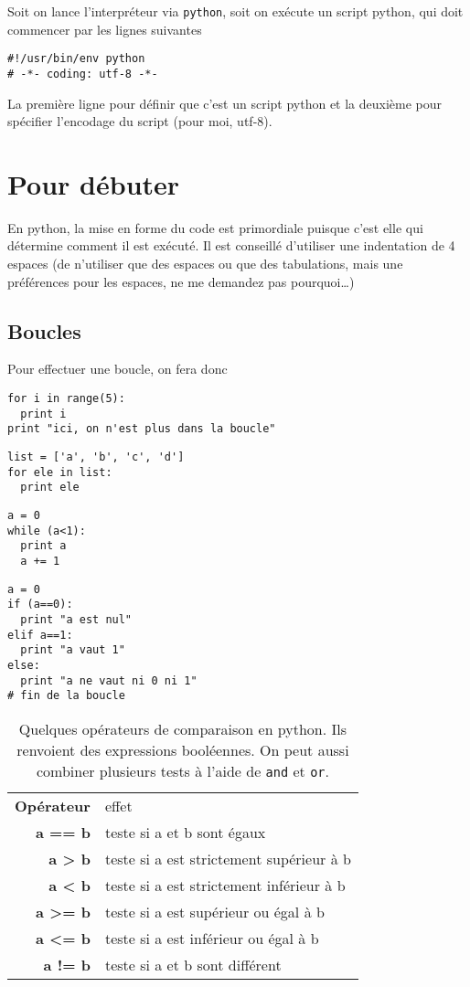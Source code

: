 \documentclass[a4paper,twoside]{article}
\title{}
\author{Autiwa}
\begin{document}
\tableofcontents

\clearpage
Soit on lance l'interpréteur via \verb|python|, soit on exécute un script python, qui doit commencer par les lignes suivantes
\begin{verbatim}
#!/usr/bin/env python
# -*- coding: utf-8 -*-
\end{verbatim}

La première ligne pour définir que c'est un script python et la deuxième pour spécifier l'encodage du script (pour moi, utf-8).

\section{Pour débuter}
En python, la mise en forme du code est primordiale puisque c'est elle qui détermine comment il est exécuté. Il est conseillé d'utiliser une indentation de 4 espaces (de n'utiliser que des espaces ou que des tabulations, mais une préférences pour les espaces, ne me demandez pas pourquoi\dots)

\subsection{Boucles}
Pour effectuer une boucle, on fera donc
\begin{verbatim}
for i in range(5):
  print i
print "ici, on n'est plus dans la boucle"
\end{verbatim}

\begin{verbatim}
list = ['a', 'b', 'c', 'd']
for ele in list:
  print ele
\end{verbatim}

\begin{verbatim}
a = 0
while (a<1):
  print a
  a += 1
\end{verbatim}

\begin{verbatim}
a = 0
if (a==0):
  print "a est nul"
elif a==1:
  print "a vaut 1"
else:
  print "a ne vaut ni 0 ni 1"
# fin de la boucle
\end{verbatim}

\begin{table}[htb]
\begin{tabular}{>{\bfseries}r<{}@{ : }p{11cm}}
Opérateur &	effet\\
a == b & teste si a et b sont égaux\\
a > b & teste si a est strictement supérieur à b\\
a < b & teste si a est strictement inférieur à b\\
a >= b & teste si a est supérieur ou égal à b\\
a <= b & teste si a est inférieur ou égal à b\\
a != b & teste si a et b sont différent
\end{tabular}
\caption{Quelques opérateurs de comparaison en python. Ils renvoient des expressions booléennes. On peut aussi combiner plusieurs tests à l'aide de \texttt{and} et \texttt{or}.}
\end{table}
\end{document}
